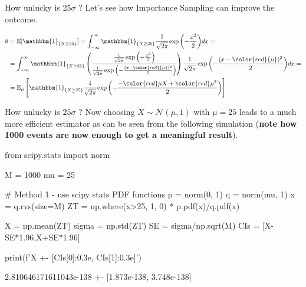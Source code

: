 \documentclass{beamer}
\begin{document}
\begin{frame}{How unlucky is $25\sigma$ ?}
Let's see how Importance Sampling can improve the outcome.

\begin{equation*}
	\begin{aligned}
		\theta &= \mathbb{E}[\mathbbm{1}_{\{X\geq 25\}}] = \int_{-\infty}^{\infty}\mathbbm{1}_{\{X\geq 25\}}\cfrac{1}{\sqrt{2\pi}}\exp{\left(-\frac{x^2}{2}\right)}dx = \\
		&= \int_{-\infty}^{\infty}\mathbbm{1}_{\{X\geq 25\}} \left(
		\cfrac{\frac{1}{\sqrt{2\pi}}\exp{\left(-\frac{x^2}{2}\right)}}{\frac{1}{\sqrt{2\pi}}\exp{\left(-\frac{(x-\color{red}{\mu})^2}{2}\right)}}
		\right) \frac{1}{\sqrt{2\pi}}\exp{\left(-\frac{(x-\color{red}{\mu})^2}{2}\right)}dx =\\
		&= \mathbb{E}_\mu\left[\mathbbm{1}_{\{X\geq 25\}} \cfrac{1}{\sqrt{2\pi}}\exp{\left(-\frac{-\color{red}\mu X+\color{red}\mu^2}{2}\right)} \right]
	\end{aligned}
\end{equation*}
\end{frame}

\begin{frame}[fragile]{How unlucky is $25\sigma$ ?}
Now choosing $X\sim\mathcal{N}(\mu, 1)$ with $\mu=25$ leads to a much more efficient estimator as can be seen from the following simulation (\textbf{note how 1000 events are now enough to get a meaningful result}).

\begin{codebox}
\begin{ipython}[linewidth=0.7\linewidth]
from scipy.stats import norm

M = 1000
mu = 25

# Method 1 - use scipy stats PDF functions
p = norm(0, 1)
q = norm(mu, 1)
x = q.rvs(size=M)
ZT = np.where(x>25, 1, 0) * p.pdf(x)/q.pdf(x)

X = np.mean(ZT)
sigma = np.std(ZT)
SE = sigma/np.sqrt(M)
CIs = [X-SE*1.96,X+SE*1.96]

print(f'{X} +- [{CIs[0]:0.3e}, {CIs[1]:0.3e}]')
\end{ipython}
\begin{ioutput}[0.7\linewidth]
	
2.810646171611043e-138 +- [1.873e-138, 3.748e-138]
\end{ioutput}
\end{codebox}
\end{frame}
\end{document}
